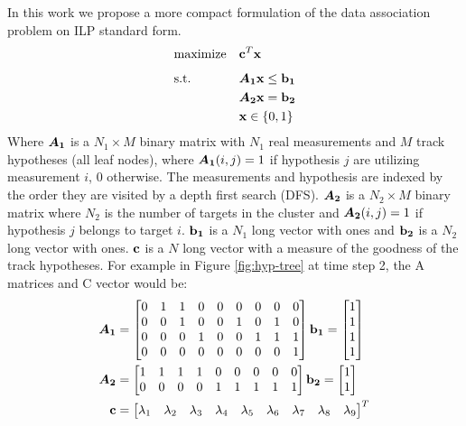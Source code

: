 In this work we propose a more compact formulation of the data association problem on ILP standard form.
\begin{equation}
\begin{aligned}
&	\underset{}{\text{maximize}}
&&	\boldsymbol{\mathbf{c}}^T \boldsymbol{\mathbf{x}} \\
&	\text{s.t.}
&&	\bm{A_1} \boldsymbol{\mathbf{x}} \leq \boldsymbol{\mathbf{b_1}} 	\\
&&&	\bm{A_2} \boldsymbol{\mathbf{x}} = \boldsymbol{\mathbf{b_2}}	\\
&&&	\boldsymbol{\mathbf{x}} \in \{0,1\}
\end{aligned}
\end{equation}
Where $\bm{A_1}$ is a $N_1 \times M$ binary matrix with $N_1$ real measurements and $M$ track hypotheses (all leaf nodes), where $\bm{A_1}(i,j)=1$ if hypothesis $j$ are utilizing measurement $i$, $0$ otherwise. The measurements and hypothesis are indexed by the order they are visited by a depth first search (DFS). $\bm{A_2}$ is a $N_2 \times M$ binary matrix where $N_2$ is the number of targets in the cluster and $\bm{A_2}(i,j)=1$ if hypothesis $j$ belongs to target $i$. $\boldsymbol{\mathbf{b_1}}$ is a $N_1$ long vector with ones and $\boldsymbol{\mathbf{b_2}}$ is a $N_2$ long vector with ones. $\boldsymbol{\mathbf{c}}$ is a $N$ long vector with a measure of the goodness of the track hypotheses. For example in Figure \ref{fig:hyp-tree} at time step 2, the A matrices  and C vector would be:
\begin{equation}
\begin{split}
\bm{A_1} &=\begin{bmatrix}
		0 & 1 & 1 & 0 & 0 & 0 & 0 & 0 & 0 \\
       	0 & 0 & 1 & 0 & 0 & 1 & 0 & 1 & 0 \\
       	0 & 0 & 0 & 1 & 0 & 0 & 1 & 1 & 1 \\
       	0 & 0 & 0 & 0 & 0 & 0 & 0 & 0 & 1 \\
     	\end{bmatrix}
\boldsymbol{\mathbf{b_1}} = 	\begin{bmatrix}
			1 \\ 1  \\ 1 \\ 1
			\end{bmatrix} \\
\bm{A_2} &=\begin{bmatrix}
		1 & 1 & 1 & 1 & 0 & 0 & 0 & 0 & 0 \\
       	0 & 0 & 0 & 0 & 1 & 1 & 1 & 1 & 1 \\
     	\end{bmatrix} 
\boldsymbol{\mathbf{b_2}} = 	\begin{bmatrix}
			1 \\ 1
			\end{bmatrix} \\
\boldsymbol{\mathbf{c}} &=\begin{bmatrix}
		\lambda_1 & \lambda_2 & \lambda_3 & \lambda_4 & \lambda_5 & \lambda_6 & \lambda_7 & \lambda_8 & \lambda_9
		\end{bmatrix}^T \\
\end{split}
\end{equation}

